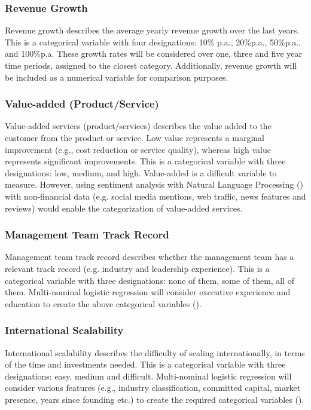 \documentclass[12pt]{article}
\begin{document}
\subsubsection{Revenue Growth}
Revenue growth describes the average yearly revenue growth over the last years. 
This is a categorical variable with four designations: 10\% p.a., 20\%p.a., 50\%p.a., and 100\%p.a. 
These growth rates will be considered over one, three and five year time periods, assigned to the closest category.
Additionally, revenue growth will be included as a numerical variable for comparison purposes. 
\subsubsection{Value-added (Product/Service)}
Value-added services (product/services) describes the value added to the customer from the product or service.
Low value represents a marginal improvement (e.g., cost reduction or service quality), whereas high value represents significant improvements.
This is a categorical variable with three designations: low, medium, and high.
Value-added is a difficult variable to measure. 
However, using sentiment analysis with Natural Language Processing (\cite{NLP}) with non-financial data (e.g. social media mentions, web traffic, news features and reviews) 
would enable the categorization of value-added services.
\subsubsection{Management Team Track Record}
Management team track record describes whether the management team has a relevant track record (e.g. industry and leadership experience).
This is a categorical variable with three designations: none of them, some of them, all of them.
Multi-nominal logistic regression will consider executive experience and education to create the above categorical variables (\cite{EDGAR201795}).
\subsubsection{International Scalability}
International scalability describes the difficulty of scaling internationally, in terms of the time and investments needed.
This is a categorical variable with three designations: easy, medium and difficult.
Multi-nominal logistic regression will consider various features (e.g., industry classification, committed capital, market presence, years since founding etc.) to create the required categorical variables (\cite{EDGAR201795}).
\end{document}
